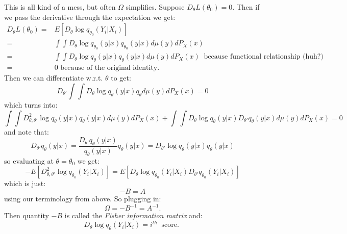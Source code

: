 \documentclass{tufte-book}
\theoremstyle{mytheoremstyle}
\theoremstyle{mylemstyle}
\theoremstyle{mydefstyle}
\begin{document}
\noindent This is all kind of a mess, but often \(\Omega\) simplifies. Suppose \(D_\theta L(\theta_0) = 0\). Then if we pass the derivative through the expectation we get:
	\begin{align*}
		D_\theta L(\theta_0) =& E[D_\theta \log q_{\theta_0} (Y_i | X_i)] \\
						=& \int \int D_\theta \log q_{\theta_0}(y|x) q_{\theta_0}(y|x) d\mu(y) dP_X(x) \\
						=&\int \int D_\theta \log q_{\theta}(y|x) q_{\theta}(y|x) d\mu(y) dP_X(x)\ \text{ because functional relationship (huh?) } \\
						=& 0 \text{ because of the original identity.}
	\end{align*}					
Then we can differentiate w.r.t. \(\theta\) to get:
	\[D_{\theta'} \int \int D_\theta \log q_\theta (y|x) q_\theta d\mu(y) dP_{X}(x) = 0\]
which turns into:
	\[\int \int D_{\theta, \theta'}^2 \log q_\theta(y|x) q_\theta(y|x) d\mu(y) dP_{X}(x) + \int \int D_\theta \log q_\theta(y|x) D_{\theta'} q_\theta(y|x) d\mu(y) dP_X (x) = 0\]
and note that:
	\[D_{\theta'} q_\theta(y|x) = \frac{D_{\theta'} q_\theta(y|x)}{q_\theta (y|x)} q_\theta (y|x) = D_{\theta'} \log q_\theta (y|x) q_\theta (y|x)\]
so evaluating at \(\theta = \theta_0\) we get:
	\[-E[D^2_{\theta, \theta'} \log q_{\theta_0} (Y_i|X_i)] = E[D_\theta \log q_{\theta_0}(Y_i|X_i) D_{\theta'} q_{\theta_0}(Y_i | X_i)] \]
which is just:
	\[-B = A\]
using our terminology from above. So plugging in:
	\[\Omega = -B^{-1} = A^{-1} \text{.}\]
Then quantity \(-B\) is called the \emph{Fisher information matrix} and:
	\[D_\theta \log q_\theta (Y_i | X_i) = i^{th}\ \text{ score. }\]
\end{document}
